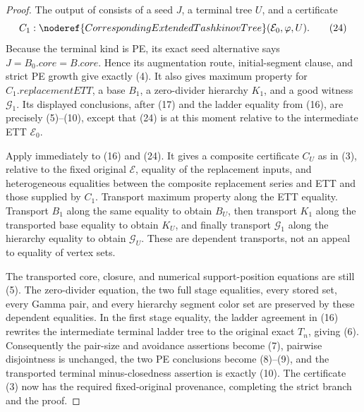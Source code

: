 \begin{proof}
The output of  consists of a seed \(J\),
a terminal tree \(U\), and a certificate
\[
 C_1:\noderef{CorrespondingExtendedTashkinovTree}
       (\mathcal E_0,\varphi,U).                                 \tag{24}
\]
Because the terminal kind is PE, its exact seed alternative says
\(J=B_0.\mathit{core}=B.\mathit{core}\).  Hence its augmentation route,
initial-segment clause, and strict PE growth give exactly (4).  It also gives
maximum property for \(C_1.\mathit{replacementETT}\), a base \(B_1\), a
zero-divider hierarchy \(K_1\), and a good witness \(\mathcal G_1\).  Its
displayed conclusions, after (17) and the ladder equality from (16), are
precisely (5)--(10), except that (24) is at this moment relative to the
intermediate ETT \(\mathcal E_0\).

Apply  immediately to
(16) and (24).  It gives a composite certificate \(C_U\) as in (3), relative
to the fixed original \(\mathcal E\), equality of the replacement inputs,
and heterogeneous equalities between the composite replacement series and
ETT and those supplied by \(C_1\).  Transport maximum property along the ETT
equality.  Transport \(B_1\) along the same equality to obtain \(B_U\), then
transport \(K_1\) along the transported base equality to obtain \(K_U\), and
finally transport \(\mathcal G_1\) along the hierarchy equality to obtain
\(\mathcal G_U\).  These are dependent transports, not an appeal to equality
of vertex sets.

The transported core, closure, and numerical support-position equations are
still (5).  The zero-divider equation, the two full stage equalities, every
stored set, every Gamma pair, and every hierarchy segment color set are
preserved by these dependent equalities.  In the first stage equality, the
ladder agreement in (16) rewrites the intermediate terminal ladder tree to
the original exact \(T_n\), giving (6).  Consequently the pair-size and
avoidance assertions become (7), pairwise disjointness is unchanged, the two
PE conclusions become (8)--(9), and the transported terminal
minus-closedness assertion is exactly (10).  The certificate (3) now has the
required fixed-original provenance, completing the strict branch and the
proof.
\end{proof}
